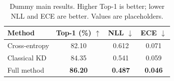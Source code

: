 \begin{table}[t]
    \centering
    \caption{Dummy main results. Higher Top-1 is better; lower NLL and ECE are
    better. Values are placeholders.}\label{tab:main-results}
    \begin{tabular}{lccc}
        \toprule
        Method & Top-1 (\%) $\uparrow$ & NLL $\downarrow$ & ECE $\downarrow$ \\
        \midrule
        Cross-entropy & 82.10 & 0.612 & 0.071 \\
        Classical KD  & 84.35 & 0.541 & 0.059 \\
        Full method   & \textbf{86.20} & \textbf{0.487} & \textbf{0.046} \\
        \bottomrule
    \end{tabular}
\end{table}
